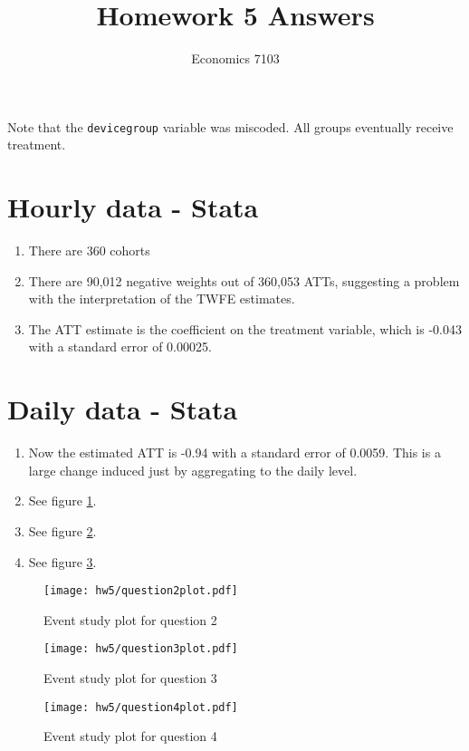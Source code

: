 \documentclass{article}
\title{Homework 5 Answers}
\author{Economics 7103}
\date{ }
\begin{document}
\maketitle

Note that the \verb|devicegroup| variable was miscoded.  All groups eventually receive treatment.

\section{Hourly data - Stata}

\begin{enumerate}
    \item There are 360 cohorts
    \item There are 90,012 negative weights out of 360,053 ATTs, suggesting a problem with the interpretation of the TWFE estimates.
    \item The ATT estimate is the coefficient on the treatment variable, which is -0.043 with a standard error of 0.00025.
\end{enumerate}

\section{Daily data - Stata}

\begin{enumerate}
    \item Now the estimated ATT is -0.94 with a standard error of 0.0059.  This is a large change induced just by aggregating to the daily level.
    \item See figure \ref{fig:hw6q2}.
    \item See figure \ref{fig:hw6q3}.
    \item See figure \ref{fig:hw6q4}.
\end{enumerate}

\begin{figure}
    \centering
    \texttt{[image: hw5/question2plot.pdf]}
    \caption{Event study plot for question 2}
    \label{fig:hw6q2}
\end{figure}

\begin{figure}
    \centering
    \texttt{[image: hw5/question3plot.pdf]}
    \caption{Event study plot for question 3}
    \label{fig:hw6q3}
\end{figure}

\begin{figure}
    \centering
    \texttt{[image: hw5/question4plot.pdf]}
    \caption{Event study plot for question 4}
    \label{fig:hw6q4}
\end{figure}
\end{document}
